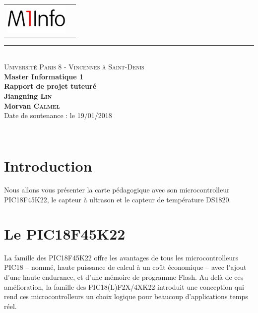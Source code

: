 \documentclass[a4paper, 12pt]{book}
\newcounter{program}[subsection]
\begin{document}
\begin{titlepage}
  \begin{center}
    \begin{tabular*}{\textwidth}{l@{\extracolsep{\fill}}r}
      \includegraphics[height=1.5cm]{images/m1info.png}
    \end{tabular*}
    \small 
    \rule{\textwidth}{.5pt}~\\
    \large 
    \textsc{Université Paris 8 - Vincennes à Saint-Denis}\vspace{0.5cm}\\
    \textbf{Master Informatique 1}\vspace{3.0cm}\\
    \Large
    \textbf{Rapport de projet tuteuré}\vspace{1.5cm}\\
    \large
    \textbf{Jiangning \textsc{Lin}}\vspace{1.5cm}\\
    \textbf{Morvan \textsc{Calmel}}\vspace{1.5cm}\\
    Date de soutenance : le 19/01/2018\vspace{1.75cm}\\
  \end{center}\vspace{1.5cm}~\\
\end{titlepage}
\frontmatter
\tableofcontents
\mainmatter
\chapter*{Introduction}
Nous allons vous présenter la carte pédagogique avec son microcontrolleur PIC18F45K22, le capteur à ultrason et le capteur de température DS1820.
\chapter{Le PIC18F45K22}
La famille des PIC18F45K22 offre les avantages de tous les microcontrolleurs  PIC18 – nommé, haute puissance de calcul à un coût économique – avec l’ajout d’une haute endurance, et d’une mémoire de programme Flash. Au delà de ces amélioration, la famille des PIC18(L)F2X/4XK22 introduit une conception qui rend ces microcontrolleurs un choix logique pour beaucoup d’applications temps réel.\\
\end{document}
